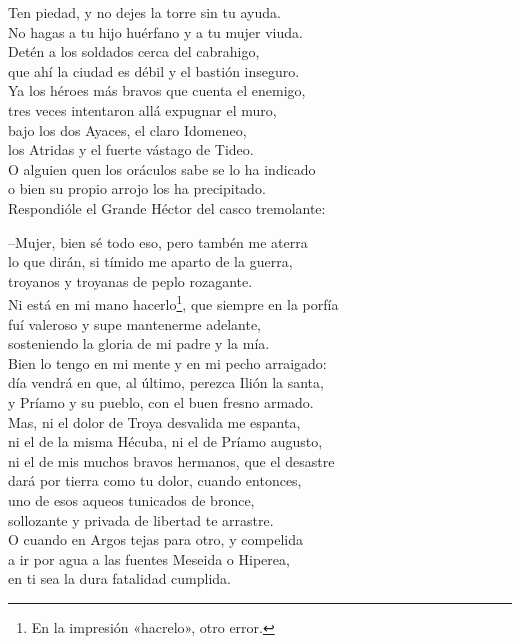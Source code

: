 Ten piedad, y no dejes la torre sin tu ayuda.\\
No hagas a tu hijo huérfano y a tu mujer viuda.\\
Detén a los soldados cerca del cabrahigo,\\
que ahí la ciudad es débil y el bastión inseguro.\\
Ya los héroes más bravos que cuenta el enemigo,\\
tres veces intentaron allá expugnar el muro,\\
bajo los dos Ayaces, el claro Idomeneo,\\
los Atridas y el fuerte vástago de Tideo.\\
O alguien quen los oráculos sabe se lo ha indicado\\
o bien su propio arrojo los ha precipitado.\\
Respondióle el Grande Héctor del casco tremolante:\par
--Mujer, bien sé todo eso, pero tambén me aterra\\
lo que dirán, si tímido me aparto de la guerra,\\
troyanos y troyanas de peplo rozagante.\\
Ni está en mi mano hacerlo\footnote{En la impresión «hacrelo», otro error.}, que siempre en la porfía\\
fuí valeroso y supe mantenerme adelante,\\
sosteniendo la gloria de mi padre y la mía.\\
Bien lo tengo en mi mente y en mi pecho arraigado:\\
día vendrá en que, al último, perezca Ilión la santa,\\
y Príamo y su pueblo, con el buen fresno armado.\\
Mas, ni el dolor de Troya desvalida me espanta,\\
ni el de la misma Hécuba, ni el de Príamo augusto,\\
ni el de mis muchos bravos hermanos, que el desastre\\
dará por tierra como tu dolor, cuando entonces,\\
uno de esos aqueos tunicados de bronce,\\
sollozante y privada de libertad te arrastre.\\
O cuando en Argos tejas para otro, y compelida\\
a ir por agua a las fuentes Meseida o Hiperea,\\
en ti sea la dura fatalidad cumplida.\\
